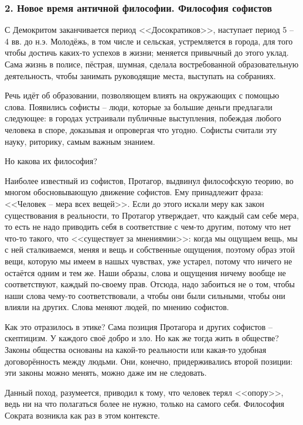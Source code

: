 \documentclass[a4paper, 12pt]{book} %
\begin{document}
\subsubsection*{2. Новое время античной философии. Философия софистов}

С Демокритом заканчивается период <<Досократиков>>, наступает период 5 -- 4 вв. до н.э. Молодёжь, в том числе и сельская, устремляется в города, для того чтобы достичь каких-то успехов в жизни; меняется привычный до этого уклад. Сама жизнь в полисе, пёстрая, шумная, сделала востребованной образовательную деятельность, чтобы занимать руководящие места, выступать на собраниях.

Речь идёт об образовании, позволяющем влиять на окружающих с помощью слова. Появились софисты -- люди, которые за большие деньги предлагали следующее: в городах устраивали публичные выступления, побеждая любого человека в споре, доказывая и опровергая что угодно. Софисты считали эту науку, риторику, самым важным знанием.

Но какова их философия? 

Наиболее известный из софистов, Протагор, выдвинул философскую теорию, во многом обосновывающую движение софистов. Ему принадлежит фраза: <<Человек -- мера всех вещей>>. Если до этого искали меру как закон существования в реальности, то Протагор утверждает, что каждый сам себе мера, то есть не надо приводить себя в соответствие с чем-то другим, потому что нет что-то такого, что <<существует за мнениямии>>: когда мы ощущаем вещь, мы с ней сталкиваемся, меняя и вещь и собственные ощущения, поэтому образ этой вещи, которую мы имеем в нашых чувствах, уже устарел, потому что ничего не остаётся одним и тем же. Наши образы, слова и ощущения ничему вообще не соответствуют, каждый по-своему прав.
Отсюда, надо забоиться не о том, чтобы наши слова чему-то соответствовали, а чтобы они были сильными, чтобы они влияли на других. Слова меняют людей, по мнению софистов.

Как это отразилось в этике? Сама позиция Протагора и других софистов -- скептицизм. У каждого своё добро и зло. Но как же тогда жить в обществе? Законы общества основаны на какой-то реальности или какая-то удобная договорённость между людьми. Они, конечно, придерживались второй позиции: эти законы можно менять, можно даже им не следовать.

Данный поход, разумеется, приводил к тому, что человек терял <<опору>>, ведь ни на что полагаться более не нужно, только на самого себя. Философия Сократа возникла как раз в этом контексте.  
\end{document}
